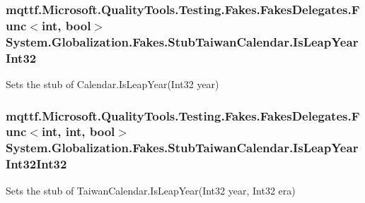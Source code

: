 \hypertarget{class_system_1_1_globalization_1_1_fakes_1_1_stub_taiwan_calendar_a4c519621ba71a48d6db12aba568f3868}{
\subsubsection[{Is\-Leap\-Year\-Int32}]{\setlength{\rightskip}{0pt plus 5cm}mqttf.\-Microsoft.\-Quality\-Tools.\-Testing.\-Fakes.\-Fakes\-Delegates.\-Func$<$int, bool$>$ System.\-Globalization.\-Fakes.\-Stub\-Taiwan\-Calendar.\-Is\-Leap\-Year\-Int32}}\label{class_system_1_1_globalization_1_1_fakes_1_1_stub_taiwan_calendar_a4c519621ba71a48d6db12aba568f3868}


Sets the stub of Calendar.\-Is\-Leap\-Year(\-Int32 year)

\hypertarget{class_system_1_1_globalization_1_1_fakes_1_1_stub_taiwan_calendar_a1d221212a3990cab12626cabc015a9cf}{
\subsubsection[{Is\-Leap\-Year\-Int32\-Int32}]{\setlength{\rightskip}{0pt plus 5cm}mqttf.\-Microsoft.\-Quality\-Tools.\-Testing.\-Fakes.\-Fakes\-Delegates.\-Func$<$int, int, bool$>$ System.\-Globalization.\-Fakes.\-Stub\-Taiwan\-Calendar.\-Is\-Leap\-Year\-Int32\-Int32}}\label{class_system_1_1_globalization_1_1_fakes_1_1_stub_taiwan_calendar_a1d221212a3990cab12626cabc015a9cf}


Sets the stub of Taiwan\-Calendar.\-Is\-Leap\-Year(\-Int32 year, Int32 era)

